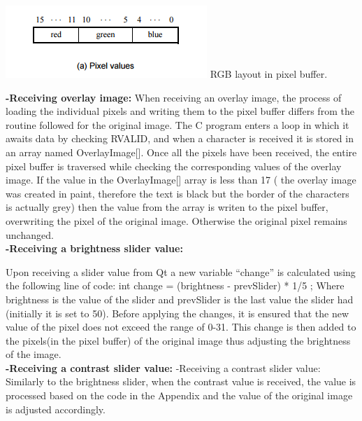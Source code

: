 \documentclass{article}
\newenvironment{Figure}
  {\par\medskip\noindent\ignorespaces\minipage{\linewidth}}
  {\endminipage\par\medskip}
\begin{document}
\begin{multicols*}{2}
\begin{Figure}
 \centering
 \includegraphics[width=\linewidth]{pix.png}
   {RGB layout in pixel buffer.}
\end{Figure}


{\bf-Receiving overlay image:}
When receiving an overlay image, the process of loading the individual pixels and writing them to the pixel buffer differs from the routine followed for the original image. The C program enters a loop in which it awaits data by checking RVALID, and when a character is received it is stored in an array named OverlayImage[]. Once all the pixels have been received, the entire pixel buffer is traversed while checking the corresponding values of the overlay image. If the value in the OverlayImage[] array is less than 17 ( the overlay image was created in paint, therefore the text is black but the border of the characters is actually grey) then the value from the array is writen to the pixel buffer, overwriting the pixel of the original image. Otherwise the original pixel remains unchanged.\\

{\bf-Receiving a brightness slider value:}

Upon receiving a slider value from Qt a new variable “change” is calculated using the following line of code:
int change = (brightness - prevSlider) * 1/5 ;
Where brightness is the  value of the slider and prevSlider is the last value the slider had (initially it is set to 50).
Before applying the changes, it is ensured that the new value of the pixel does not exceed the range of 0-31.
This change is then added to the pixels(in the pixel buffer) of the original image thus adjusting the brightness of the image.\\

{\bf-Receiving a contrast slider value:}
-Receiving a contrast slider value:
Similarly to the brightness slider, when the contrast value is received, the value is processed based on the code in the Appendix and the value of the original image is adjusted accordingly.











\end{multicols*}
\end{document}

